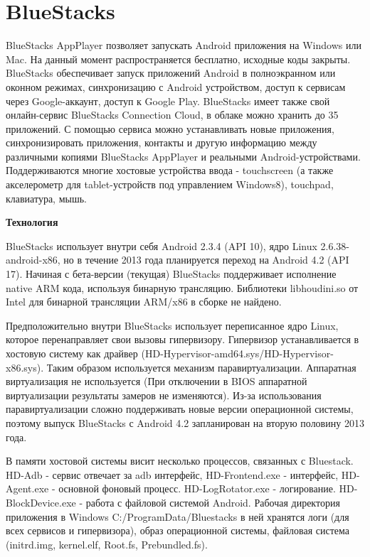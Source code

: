 \section{BlueStacks}

BlueStacks AppPlayer позволяет запускать Android приложения на Windows или Mac. На данный момент распространяется бесплатно, исходные коды закрыты. BlueStacks обеспечивает запуск приложений Android в полноэкранном или оконном режимах, синхронизацию с Android устройством, доступ к сервисам через Google-аккаунт, доступ к Google Play. BlueStacks имеет также свой онлайн-сервис BlueStacks Connection Cloud, в облаке можно хранить до 35 приложений. С помощью сервиса можно устанавливать новые приложения, синхронизировать приложения, контакты и другую информацию между различными копиями BlueStacks AppPlayer и реальными Android-устройствами. Поддерживаются многие хостовые устройства ввода - touchscreen (а также акселерометр для tablet-устройств под управлением Windows8), touchpad, клавиатура, мышь.

\textbf{Технология}

BlueStacks использует внутри себя Android 2.3.4 (API 10), ядро Linux 2.6.38-android-x86, но в течение 2013 года планируется переход на Android 4.2 (API 17). Начиная с бета-версии (текущая) BlueStacks поддерживает исполнение native ARM кода, используя бинарную трансляцию. Библиотеки libhoudini.so от Intel для бинарной трансляции ARM/x86 в сборке не найдено.

Предположительно внутри BlueStacks использует переписанное ядро Linux, которое перенаправляет свои вызовы гипервизору. Гипервизор устанавливается в хостовую систему как драйвер (HD-Hypervisor-amd64.sys/HD-Hypervisor-x86.sys). Таким образом используется механизм паравиртуализации. Аппаратная виртуализация не используется (При отключении в BIOS аппаратной виртуализации результаты замеров не изменяются). Из-за использования паравиртуализации сложно поддерживать новые версии операционной системы, поэтому выпуск BlueStacks с Android 4.2 запланирован на вторую половину 2013 года.

В памяти хостовой системы висит несколько процессов, связанных с Bluestack. HD-Adb - сервис отвечает за adb интерфейс, HD-Frontend.exe - интерфейс, HD-Agent.exe - основной фоновый процесс. HD-LogRotator.exe - логирование. HD-BlockDevice.exe - работа с файловой системой Android. Рабочая директория приложения в Windows C:/ProgramData/Bluestacks в ней хранятся логи (для всех сервисов и гипервизора), образ операционной системы, файловая система (initrd.img, kernel.elf, Root.fs, Prebundled.fs).

